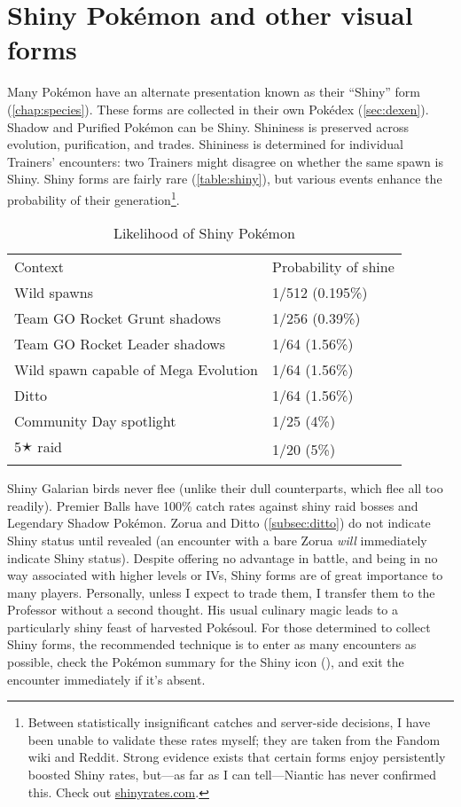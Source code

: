 \section{Shiny Pokémon and other visual forms\label{sec:shiny}}
Many Pokémon have an alternate presentation known as their ``Shiny'' form (\autoref{chap:species}).
These forms are collected in their own Pokédex (\autoref{sec:dexen}).
Shadow and Purified Pokémon can be Shiny.
Shininess is preserved across evolution, purification, and trades.
Shininess is determined for individual Trainers' encounters: two Trainers might disagree on whether the same spawn is Shiny.
Shiny forms are fairly rare (\autoref{table:shiny}), but various events
  enhance the probability of their generation\footnote{Between statistically insignificant catches and server-side decisions, I have been unable to validate these rates myself; they are taken from the Fandom wiki and Reddit.
  Strong evidence exists that certain forms enjoy persistently boosted Shiny rates, but---as far as I can tell---Niantic
  has never confirmed this. Check out \href{https://shinyrates.com}{shinyrates.com}.}.
\begin{table}
\centering
\begin{tabular}{ll}
Context & Probability of shine \\
\Midrule
  Wild spawns & 1/512 (0.195\%) \\
  Team GO Rocket Grunt shadows & 1/256 (0.39\%) \\
  Team GO Rocket Leader shadows & 1/64 (1.56\%) \\
  Wild spawn capable of Mega Evolution & 1/64 (1.56\%)\\
  Ditto & 1/64 (1.56\%)\\
  Community Day spotlight & 1/25 (4\%)\\
  5🟉 raid & 1/20 (5\%) \\
\end{tabular}
  \caption{Likelihood of Shiny Pokémon\label{table:shiny}}
\end{table}
Shiny Galarian birds never flee (unlike their dull counterparts, which flee all too readily).
Premier Balls have 100\% catch rates against shiny raid bosses and Legendary Shadow Pokémon.
Zorua and Ditto (\autoref{subsec:ditto}) do not indicate Shiny status until revealed (an encounter
  with a bare Zorua \textit{will} immediately indicate Shiny status).
Despite offering no advantage in battle, and being in no way associated with
  higher levels or IVs, Shiny forms are of great importance to many players.
Personally, unless I expect to trade them, I transfer them to the Professor
  without a second thought.
His usual culinary magic leads to a particularly shiny feast of harvested Pokésoul.
For those determined to collect Shiny forms, the recommended technique
  is to enter as many encounters as possible, check the Pokémon summary
  for the Shiny icon (),
  and exit the encounter immediately if it's absent.

